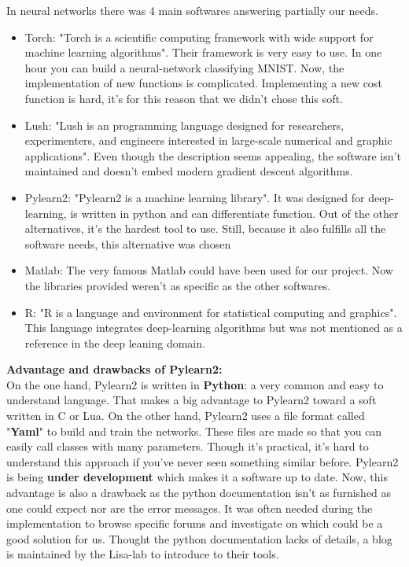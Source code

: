 		In neural networks there was 4 main softwares answering partially our needs.
		\begin{itemize}
			\item Torch: "Torch is a scientific computing framework with wide support for machine learning algorithms". Their framework is very easy to use. In one hour you can build a neural-network classifying MNIST. Now, the implementation of new functions is complicated. Implementing a new cost function is hard, it's for this reason that we didn't chose this soft.
			\item Lush: "Lush is an programming language designed for researchers, experimenters, and engineers interested in large-scale numerical and graphic applications". Even though the description seems appealing, the software isn't maintained and doesn't embed modern gradient descent algorithms. 
			\item Pylearn2: "Pylearn2 is a machine learning library". It was designed for deep-learning, is written in python and can differentiate function. Out of the other alternatives, it's the hardest tool to use. Still, because it also fulfills all the software needs, this alternative was chosen
			\item Matlab: The very famous Matlab could have been used for our project. Now the libraries provided weren't as specific as the other softwares.
			\item R: "R is a language and environment for statistical computing and graphics". This language integrates deep-learning algorithms but was not mentioned as a reference in the deep leaning domain.
		\end{itemize}


		\vskip 1cm
		\textbf{Advantage and drawbacks of Pylearn2:}\\
		On the one hand, Pylearn2 is written in \textbf{Python}: a very common and easy to understand language. That makes a big advantage to Pylearn2 toward a soft written in C or Lua. On the other hand, Pylearn2 uses a file format called "\textbf{Yaml}" to build and train the networks. These files are made so that you can easily call classes with many parameters. Though it's practical, it's hard to understand this approach if you've never seen something similar before.
		Pylearn2 is being \textbf{under development} which makes it a software up to date. Now, this advantage is also a drawback as the python documentation isn't as furnished as one could expect nor are the error messages. It was often needed during the implementation to browse specific forums and investigate on which could be a good solution for us. Thought the python documentation lacks of details, a blog is maintained by the Lisa-lab to introduce to their tools.

